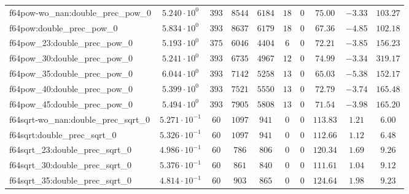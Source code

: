 \begin{tabular}{|l|c|c|c|c|c|c|c|c|c|}
f64pow-wo\_nan:double\_prec\_pow\_0            & $ 5.240 \cdot 10^{0}  $ & $ 393    $ & $ 8544   $ & $ 6184  $ & $ 18  $ & $ 0  $ & $ 75.00       $ & $ -3.33   $ & $ 103.27  $ \\
f64pow:double\_prec\_pow\_0                    & $ 5.834 \cdot 10^{0}  $ & $ 393    $ & $ 8637   $ & $ 6179  $ & $ 18  $ & $ 0  $ & $ 67.36       $ & $ -4.85   $ & $ 102.18  $ \\
f64pow\_23:double\_prec\_pow\_0                & $ 5.193 \cdot 10^{0}  $ & $ 375    $ & $ 6046   $ & $ 4404  $ & $ 6   $ & $ 0  $ & $ 72.21       $ & $ -3.85   $ & $ 156.23  $ \\
f64pow\_30:double\_prec\_pow\_0                & $ 5.241 \cdot 10^{0}  $ & $ 393    $ & $ 6735   $ & $ 4967  $ & $ 12  $ & $ 0  $ & $ 74.99       $ & $ -3.34   $ & $ 319.17  $ \\
f64pow\_35:double\_prec\_pow\_0                & $ 6.044 \cdot 10^{0}  $ & $ 393    $ & $ 7142   $ & $ 5258  $ & $ 13  $ & $ 0  $ & $ 65.03       $ & $ -5.38   $ & $ 152.17  $ \\
f64pow\_40:double\_prec\_pow\_0                & $ 5.399 \cdot 10^{0}  $ & $ 393    $ & $ 7521   $ & $ 5550  $ & $ 13  $ & $ 0  $ & $ 72.79       $ & $ -3.74   $ & $ 165.48  $ \\
f64pow\_45:double\_prec\_pow\_0                & $ 5.494 \cdot 10^{0}  $ & $ 393    $ & $ 7905   $ & $ 5808  $ & $ 13  $ & $ 0  $ & $ 71.54       $ & $ -3.98   $ & $ 165.20  $ \\
f64sqrt-wo\_nan:double\_prec\_sqrt\_0          & $ 5.271 \cdot 10^{-1} $ & $ 60     $ & $ 1097   $ & $ 941   $ & $ 0   $ & $ 0  $ & $ 113.83      $ & $ 1.21    $ & $ 6.00    $ \\
f64sqrt:double\_prec\_sqrt\_0                  & $ 5.326 \cdot 10^{-1} $ & $ 60     $ & $ 1097   $ & $ 941   $ & $ 0   $ & $ 0  $ & $ 112.66      $ & $ 1.12    $ & $ 6.48    $ \\
f64sqrt\_23:double\_prec\_sqrt\_0              & $ 4.986 \cdot 10^{-1} $ & $ 60     $ & $ 786    $ & $ 806   $ & $ 0   $ & $ 0  $ & $ 120.34      $ & $ 1.69    $ & $ 9.26    $ \\
f64sqrt\_30:double\_prec\_sqrt\_0              & $ 5.376 \cdot 10^{-1} $ & $ 60     $ & $ 861    $ & $ 840   $ & $ 0   $ & $ 0  $ & $ 111.61      $ & $ 1.04    $ & $ 9.12    $ \\
f64sqrt\_35:double\_prec\_sqrt\_0              & $ 4.814 \cdot 10^{-1} $ & $ 60     $ & $ 903    $ & $ 865   $ & $ 0   $ & $ 0  $ & $ 124.64      $ & $ 1.98    $ & $ 9.23    $ \\

\end{tabular}
